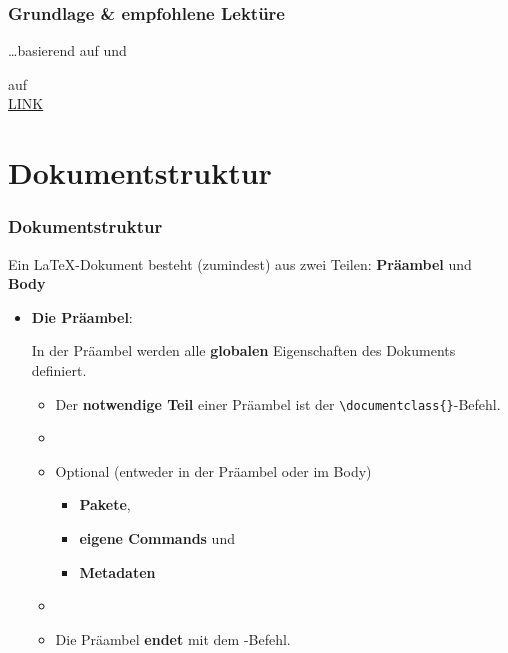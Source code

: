 \begin{frame}
\frametitle{Grundlage \& empfohlene Lektüre}

\dots basierend auf \citet{Freitag&MyP15a} und 

auf \citet{MyP&Kerkhof16a}\\
\ras \href{https://www.researchgate.net/publication/279514740_LATEX-Einfuhrung_fur_Linguisten}{LINK}

\end{frame}


\section{Dokumentstruktur}

\begin{frame}[fragile]
\frametitle{Dokumentstruktur}

Ein \LaTeX -Dokument besteht (zumindest) aus zwei Teilen: \textbf{Präambel} und \textbf{Body}

\begin{itemize}
\item \textbf{Die Präambel}:

In der Präambel werden alle \textbf{globalen} Eigenschaften des Dokuments definiert. 

	\begin{itemize}
		\item Der \textbf{notwendige Teil} einer Präambel ist der \lstinline|\documentclass{}|-Befehl.
		
		\item[]
		
		\item Optional (entweder in der Präambel oder im Body)
		\begin{itemize}
			\item \textbf{Pakete}, 
			
			\item \textbf{eigene Commands} und 
			
			\item \textbf{Metadaten} 
		\end{itemize}
		
		\item[]
		
		\item Die Präambel \textbf{endet} mit dem \lstinline||-Befehl. 
	
	\end{itemize}

\end{itemize}
\end{frame}


